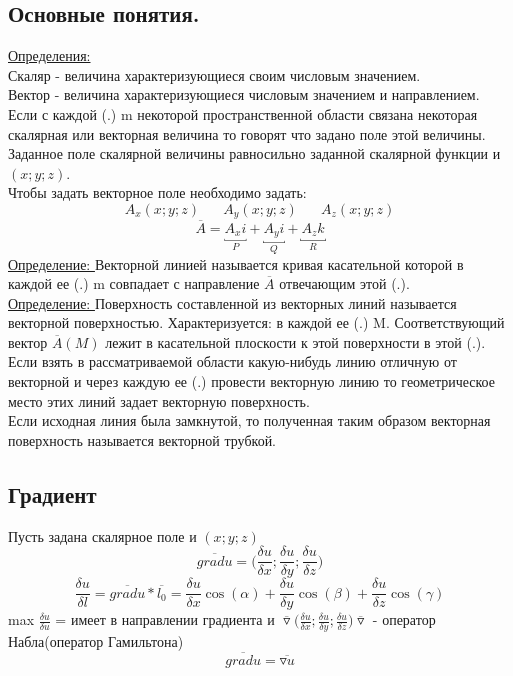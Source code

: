\documentclass[12pt]{article}
\begin{document}
  \subsection{Основные понятия.}
  \underline{Определения: }\\
  Скаляр - величина характеризующиеся своим числовым значением.\\
  Вектор - величина характеризующиеся числовым значением и направлением.\\
  Если с каждой (.) m некоторой пространственной области связана некоторая скалярная или векторная величина то говорят что
  задано поле этой величины. Заданное поле скалярной величины равносильно заданной скалярной функции и $(x;y;z)$.\\
  Чтобы задать векторное поле необходимо задать:
  \[A_x(x;y;z) \hspace{20pt} A_y(x;y;z) \hspace{20pt} A_z(x;y;z)\]
  \[\overline{A}=\underbracket{A_x i}_{P}+\underbracket{A_y i}_{Q}+\underbracket{A_z k}_{R}\]
  \underline{Определение: } Векторной линией называется кривая касательной которой в каждой ее (.) m совпадает
  с направление $\overline{A}$ отвечающим этой (.).\\
  \underline{Определение: } Поверхность составленной из векторных линий называется векторной поверхностью.
  Характеризуется: в каждой ее (.) M. Соответствующий вектор $\overline{A}(M)$ лежит в касательной плоскости к
  этой поверхности в этой (.).\\
  Если взять в рассматриваемой области какую-нибудь линию отличную от векторной и через каждую ее
  (.) провести векторную линию то геометрическое место этих линий задает векторную поверхность.\\
  Если исходная линия была замкнутой, то полученная таким образом векторная поверхность называется 
  векторной трубкой.
  \break
  \subsection{Градиент}
  Пусть задана скалярное поле и $(x;y;z)$
  \[\overline{grad u} = \Big(\frac{\delta u}{\delta x};\frac{\delta u}{\delta y};\frac{\delta u}{\delta z}\Big)\]
  \[\frac{\delta u}{\delta l}=\overline{grad u} * \overline{l_0}=
  \frac{\delta u}{\delta x}\cos(\alpha)+
  \frac{\delta u}{\delta y}\cos(\beta)+
  \frac{\delta u}{\delta z}\cos(\gamma)\]
  max $\frac{\delta u}{\delta u}$ =  имеет в направлении градиента и $\overline{\triangledown}
  \Big(\frac{\delta u}{\delta x};\frac{\delta u}{\delta y};\frac{\delta u}{\delta z}\Big)
  \overline{\triangledown}$ - оператор Набла(оператор Гамильтона)
  \[\overline{gradu}=\overline{\triangledown u}\]
\end{document}
